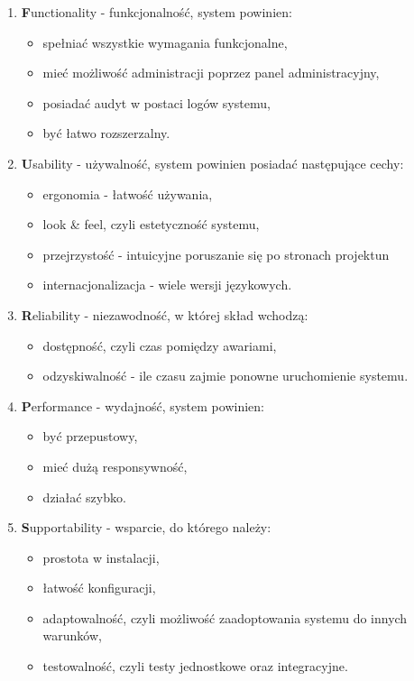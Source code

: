 \begin{enumerate}
	\item \textbf{F}unctionality - funkcjonalność, system powinien:
		\begin{itemize}
			\item spełniać wszystkie wymagania funkcjonalne,
			\item mieć możliwość administracji poprzez panel administracyjny,
			\item posiadać audyt w postaci logów systemu,
			\item być łatwo rozszerzalny.
		\end{itemize}
	\item \textbf{U}sability - używalność, system powinien posiadać następujące cechy:
		\begin{itemize}
			\item ergonomia - łatwość używania,
			\item look \& feel, czyli estetyczność systemu,
			\item przejrzystość - intuicyjne poruszanie się po stronach projektun
			\item internacjonalizacja - wiele wersji językowych.
		\end{itemize}
	\item \textbf{R}eliability - niezawodność, w której skład wchodzą:
		\begin{itemize}
			\item dostępność, czyli czas pomiędzy awariami,
			\item odzyskiwalność - ile czasu zajmie ponowne uruchomienie systemu.
		\end{itemize}
	\item \textbf{P}erformance - wydajność, system powinien:
		\begin{itemize}
			\item być przepustowy,
			\item mieć dużą responsywność,
			\item działać szybko.
		\end{itemize}
	\item \textbf{S}upportability - wsparcie, do którego należy:
		\begin{itemize}
			\item prostota w instalacji,
			\item łatwość konfiguracji,
			\item adaptowalność, czyli możliwość zaadoptowania systemu do innych warunków,
			\item testowalność, czyli testy jednostkowe oraz integracyjne.
		\end{itemize}
\end{enumerate}

